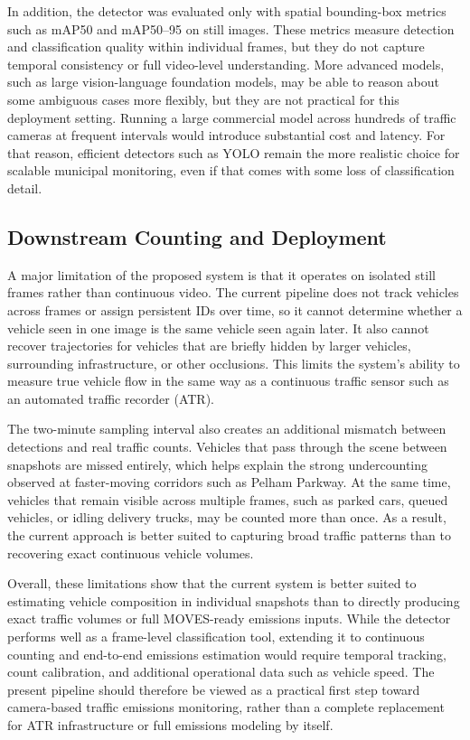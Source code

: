 In addition, the detector was evaluated only with spatial bounding-box metrics such
as mAP50 and mAP50--95 on still images. These metrics measure detection and classification 
quality within individual frames, but they do not capture temporal consistency or 
full video-level understanding. More advanced models, such as large vision-language foundation
models, may be able to reason about some ambiguous cases more 
flexibly, but they are not practical for this deployment setting. Running a large 
commercial model across hundreds of traffic cameras at frequent intervals would 
introduce substantial cost and latency. For that reason, efficient detectors such
as YOLO remain the more realistic choice for scalable municipal monitoring, even 
if that comes with some loss of classification detail.


\subsection{Downstream Counting and Deployment}

A major limitation of the proposed system is that it operates on isolated still 
frames rather than continuous video. The current pipeline does not track vehicles
across frames or assign persistent IDs over time, so it cannot determine whether 
a vehicle seen in one image is the same vehicle seen again later. It also cannot 
recover trajectories for vehicles that are briefly hidden by larger vehicles, 
surrounding infrastructure, or other occlusions. This limits the system’s ability 
to measure true vehicle flow in the same way as a continuous traffic sensor such 
as an automated traffic recorder (ATR).

The two-minute sampling interval also creates an additional mismatch between 
detections and real traffic counts. Vehicles that pass through the scene between 
snapshots are missed entirely, which helps explain the strong undercounting observed
at faster-moving corridors such as Pelham Parkway. At the same time, vehicles that 
remain visible across multiple frames, such as parked cars, queued vehicles, or 
idling delivery trucks, may be counted more than once. As a result, the current 
approach is better suited to capturing broad traffic patterns than to recovering 
exact continuous vehicle volumes.


Overall, these limitations show that the current system is better suited to estimating 
vehicle composition in individual snapshots than to directly producing exact traffic 
volumes or full MOVES-ready emissions inputs. While the detector performs well as a 
frame-level classification tool, extending it to continuous counting and end-to-end 
emissions estimation would require temporal tracking, count calibration, and additional 
operational data such as vehicle speed. The present pipeline should therefore be viewed
as a practical first step toward camera-based traffic emissions monitoring, rather than 
a complete replacement for ATR infrastructure or full emissions modeling by itself.


